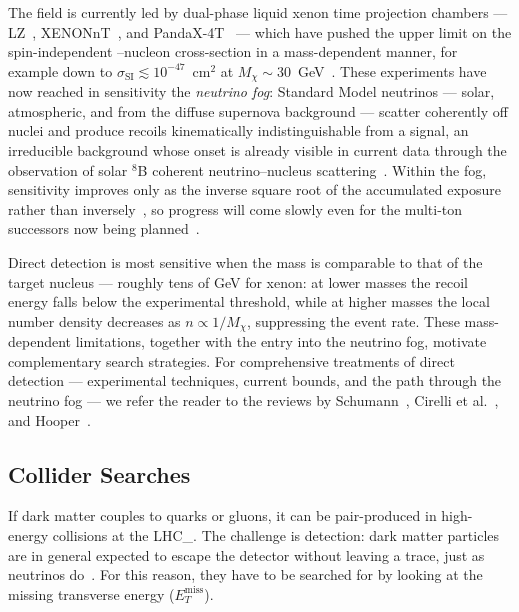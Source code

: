 The field is currently led by dual-phase liquid xenon time projection chambers --- LZ~\cite{LZ:2022lsv}, XENONnT~\cite{XENON:2023cxc}, and PandaX-4T~\cite{PandaX-4T:2021bab} --- which have pushed the upper limit on the spin-independent \WIMP--nucleon cross-section in a mass-dependent manner, for example down to $\sigma_\text{SI} \lesssim 10^{-47}$~cm$^2$ at $M_\chi \sim 30$~GeV~\cite{LZ:2024zvo}.
These experiments have now reached in sensitivity the \emph{neutrino fog}: Standard Model neutrinos --- solar, atmospheric, and from the diffuse supernova background --- scatter coherently off nuclei and produce recoils kinematically indistinguishable from a \WIMP signal, an irreducible background whose onset is already visible in current data through the observation of solar $^8$B coherent neutrino--nucleus scattering~\cite{XENON:2020gfr,PandaX:2024muv,XENON:2024hup,LZ:2024zvo}.
Within the fog, sensitivity improves only as the inverse square root of the accumulated exposure rather than inversely~\cite{OHare:2021utq}, so progress will come slowly even for the multi-ton successors now being planned~\cite{DARWIN:2016hyl}.

Direct detection is most sensitive when the \WIMP mass is comparable to that of the target nucleus --- roughly tens of GeV for xenon: at lower masses the recoil energy falls below the experimental threshold, while at higher masses the local number density decreases as $n \propto 1/M_\chi$, suppressing the event rate.
These mass-dependent limitations, together with the entry into the neutrino fog, motivate complementary search strategies.
For comprehensive treatments of direct detection --- experimental techniques, current bounds, and the path through the neutrino fog --- we refer the reader to the reviews by Schumann~\cite{Schumann:2019eaa}, Cirelli et al.~\cite{Cirelli:2024ssz}, and Hooper~\cite{Hooper:2024}.

\subsection{Collider Searches}
\label{sec:1.3.2}

If dark matter couples to quarks or gluons, it can be pair-produced in high-energy collisions at the \gls{LHC_}.
The challenge is detection: dark matter particles are in general expected to escape the detector without leaving a trace, just as neutrinos do~\cite{Cirelli:2024ssz}.
For this reason, they have to be searched for by looking at the missing transverse energy ($E_T^\text{miss}$).

